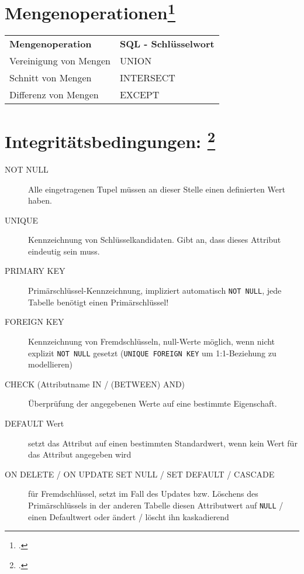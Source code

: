 \documentclass{lehramt-informatik-haupt}
\begin{document}
\section{Mengenoperationen\footcite[Seite 157]{winter}}

\noindent
\begin{tabular}{ll}
\textbf{Mengenoperation} &
\textbf{SQL - Schlüsselwort} \\

Vereinigung von Mengen &
UNION \\

Schnitt von Mengen &
INTERSECT \\

Differenz von Mengen &
EXCEPT \\
\end{tabular}

%

\section{Integritätsbedingungen:
\footcite[Seite 7]{db:fs:2}}

\begin{description}

\item[NOT NULL]

Alle eingetragenen Tupel müssen an dieser Stelle einen definierten Wert
haben.

\item[UNIQUE]

Kennzeichnung von Schlüsselkandidaten. Gibt an, dass dieses Attribut
eindeutig sein muss.

\item[PRIMARY KEY]

Primärschlüssel-Kennzeichnung, impliziert automatisch \verb|NOT NULL|,
jede Tabelle benötigt einen Primärschlüssel!

\item[FOREIGN KEY]

Kennzeichnung von Fremdschlüsseln, null-Werte möglich, wenn nicht
explizit \verb|NOT NULL| gesetzt (\verb|UNIQUE FOREIGN KEY| um
1:1-Beziehung zu modellieren)

\item[CHECK (Attributname IN / (BETWEEN) AND)]

Überprüfung der angegebenen Werte auf eine bestimmte Eigenschaft.

\item[DEFAULT Wert]

setzt das Attribut auf einen bestimmten Standardwert, wenn kein Wert für
das Attribut angegeben wird

\item[ON DELETE / ON UPDATE SET NULL / SET DEFAULT / CASCADE]

für Fremdschlüssel, setzt im Fall des Updates bzw. Löschens des
Primärschlüssels in der anderen Tabelle diesen Attributwert auf
\verb|NULL| / einen Defaultwert oder ändert / löscht ihn kaskadierend
\end{description}
\end{document}
